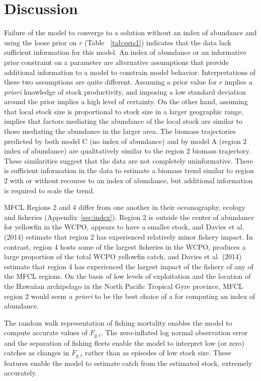 \documentclass[12pt,letterpaper]{article}
\begin{document}
\section*{Discussion}
Failure of the model to converge to a solution without an index of
abundance and using the loose prior on $r$ (Table~ \ref{tab:ests1})
indicates that the data lack sufficient information for this model.
An index of abundance or an informative prior
constraint on a parameter are
alternative assumptions that provide additional information to a model
to constrain model behavior.
Interpretations of these two assumptions are quite different. 
Assuming a prior value for $r$ implies {\it a priori} knowledge of stock
productivity, and imposing a low standard deviation around the
prior implies a high level of certainty. On the other hand,
assuming that local stock size is proportional to stock size in
a larger geographic range,
implies that factors mediating the abundance
of the local stock are similar to those mediating the
abundance in the larger area.
The biomass trajectories predicted by both model C (no index of abundance) 
and by model A (region 2 index of abundance) are
qualitatively similar to the region 2 biomass trajectory.
These similarities suggest that the data are not completely
uninformative. There is sufficient information in the
data to estimate a biomass trend similar to region 2 with or without
recourse to an index of abundance, but additional information is
required to scale the trend.

MFCL Regions 2 and 4 differ from one another in their oceanography,
ecology and fisheries (Appendix~\ref{sec:index}). 
Region 2 is outside the center of abundance for yellowfin in the
WCPO, appears to have a smaller stock, and Davies et al. (2014)
estimate that region 2 has experienced relatively minor fishery impact.
In contrast, region 4 hosts some of the largest fisheries in the WCPO,
produces a large proportion of the total WCPO yellowfin catch, and
Davies et al. (2014) estimate that region 4 has experienced
the largest impact of the fishery of any of the MFCL regions.
On the basis of low levels of exploitation and the location of the
Hawaiian archipelago in the North Pacific Tropical Gyre province, MFCL
region 2 would seem {\it a priori} to be the best choice of a for
computing an index of abundance.

The random walk representation of fishing mortality enables
the model to compute accurate values of $F_{g,t}$. The zero-inflated
log normal observation error and the separation of fishing fleets
enable the model to interpret low (or zero) catches as changes in
$F_{g,t}$ rather than as episodes of low stock size.
These features enable the model to estimate catch
from the estimated stock, extremely accurately.
\end{document}
